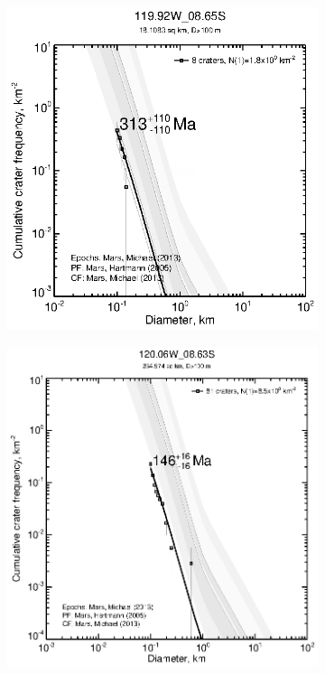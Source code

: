 \documentclass[12pt,letter]{article}
\begin{document}
\begin{figure}[h]
\begin{subfigure}{.33\textwidth}
\end{subfigure}%
\begin{subfigure}{.33\textwidth}
  \includegraphics[width=\linewidth,clip,trim=1cm 1cm 1.5cm 1cm]{figures/craterstats/119-92W_08-65S_100m_cum.eps}
\end{subfigure}
\begin{subfigure}{.33\textwidth}
  \includegraphics[width=\linewidth,clip,trim=1cm 1cm 1.5cm 1cm]{figures/craterstats/120-06W_08-63S_100m_cum.eps}

\end{subfigure}
\end{figure}
\end{document}
